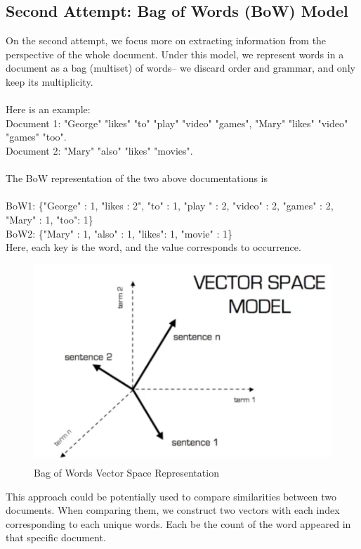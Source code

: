 \documentclass[paper=a4, fontsize=12pt]{scrartcl}
\begin{document}
\subsection{Second Attempt: Bag of Words (BoW) Model}
 On the second attempt, we focus more on extracting information from the perspective of the whole document. Under this model, we represent words in a document as a bag (multiset) of words-- we discard order and grammar, and only keep its multiplicity.\\\\
Here is an example:\\
Document 1: "George" "likes" "to" "play" "video" "games", "Mary" "likes" "video" "games" "too".\\
Document 2: "Mary" "also" "likes" "movies".\\\\
The BoW representation of the two above documentations is\\\\
BoW1: \{"George" : 1, "likes : 2", "to" : 1, "play " : 2, "video" : 2, "games" : 2, "Mary" : 1,  "too": 1\}\\
BoW2: \{"Mary" : 1, "also" : 1, "likes": 1, "movie" : 1\}\\
Here, each key is the word, and the value corresponds to occurrence. \\
\begin{figure}
  \includegraphics[width=\linewidth]{bow.png}
  \caption{Bag of Words Vector Space Representation}
  \label{fig:bow}
\end{figure}
This approach could be potentially used to compare similarities between two documents. When comparing them, we construct two vectors with each index corresponding to each unique words. Each be the count of the word appeared in that specific document. 
\end{document}
